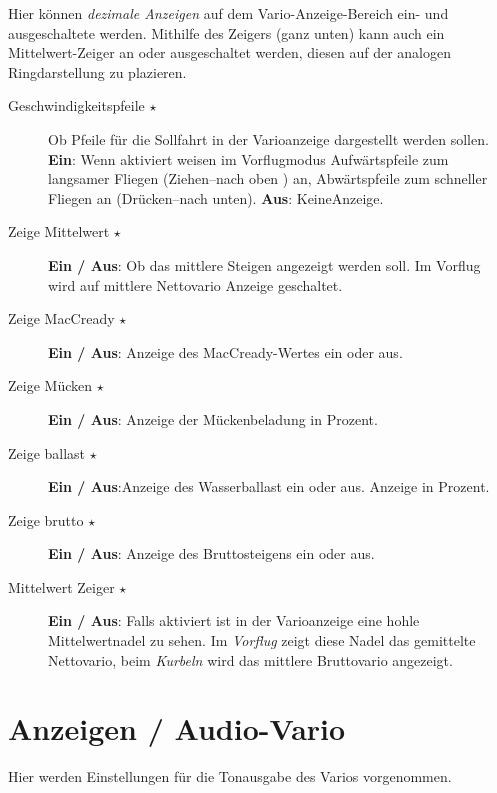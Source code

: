 Hier können \textsl{dezimale Anzeigen} auf dem Vario-Anzeige-Bereich  ein- und ausgeschaltete werden.
Mithilfe des Zeigers (ganz unten) kann auch ein Mittelwert-Zeiger an oder ausgeschaltet werden,
 diesen auf der analogen Ringdarstellung zu plazieren.
\begin{description}
\item[Geschwindigkeitspfeile $\star$]  \label{conf:variogauge} Ob Pfeile für die Sollfahrt  in der Varioanzeige dargestellt werden sollen.\\
{\bf Ein}: Wenn aktiviert weisen im Vorflugmodus  Aufwärtspfeile zum langsamer Fliegen (Ziehen--nach oben ) an,  Abwärtspfeile zum schneller Fliegen an (Drücken--nach unten).
{\bf Aus}:  KeineAnzeige.\\
\item[Zeige Mittelwert $\star$]  {\bf Ein / Aus}: Ob das mittlere Steigen angezeigt werden soll.
Im Vorflug wird auf mittlere Nettovario Anzeige geschaltet.
\item[Zeige MacCready $\star$] {\bf Ein / Aus}: Anzeige des  MacCready-Wertes  ein oder aus.
\item[Zeige Mücken $\star$] {\bf Ein / Aus}: Anzeige der Mückenbeladung in Prozent.
\item[Zeige ballast $\star$] {\bf Ein / Aus}:Anzeige des Wasserballast ein oder aus. Anzeige in Prozent.
\item[Zeige brutto $\star$] {\bf Ein / Aus}: Anzeige des Bruttosteigens ein oder aus.
\item[Mittelwert Zeiger $\star$] {\bf Ein / Aus}: Falls aktiviert ist in der Varioanzeige eine hohle Mittelwertnadel zu sehen.
Im \textsl{Vorflug} zeigt diese Nadel das gemittelte Nettovario,
beim \textsl{Kurbeln} wird das mittlere Bruttovario angezeigt.
\end{description}

\section{Anzeigen / Audio-Vario}\label{sec:audiovario-gauge}

Hier werden Einstellungen für die Tonausgabe des Varios vorgenommen.
\label{conf:audiovariogauge}

